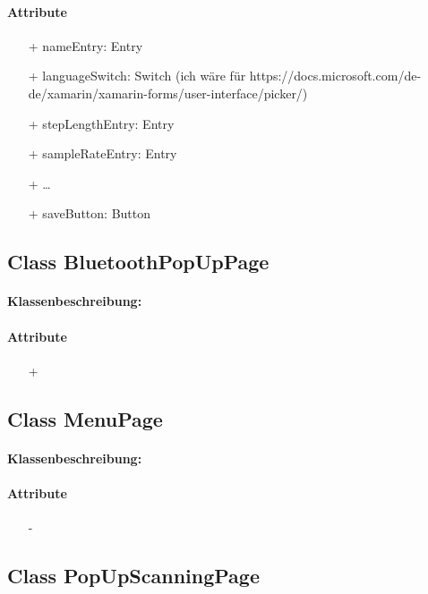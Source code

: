 \documentclass[a4paper,12pt]{article}
\begin{document}
		\paragraph{Attribute}
		\begin{itemize}
			\item [+]nameEntry: Entry
			\item [+]languageSwitch: Switch (ich wäre für https://docs.microsoft.com/de-de/xamarin/xamarin-forms/user-interface/picker/)
			\item [+]stepLengthEntry: Entry
			\item [+]sampleRateEntry: Entry
			\item [+]\dots
			\item [+]saveButton: Button
		\end{itemize}
	
	\subsection{Class BluetoothPopUpPage}
		\paragraph{Klassenbeschreibung:}
		\paragraph{Attribute}
		\begin{itemize}
			\item [+]
		\end{itemize}

	\subsection{Class MenuPage}
		\paragraph{Klassenbeschreibung:}
		\paragraph{Attribute}
		\begin{itemize}
			\item [-]
		\end{itemize}

	\subsection{Class PopUpScanningPage}
\end{document}
